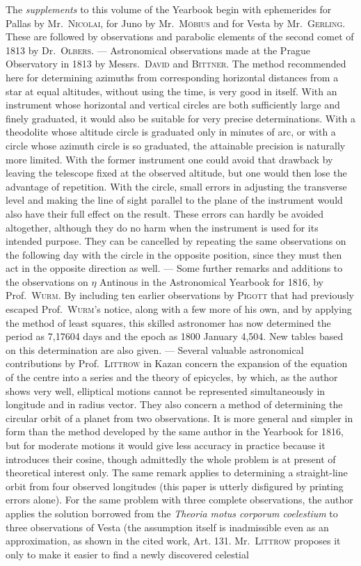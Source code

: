 The \emph{supplements} to this volume of the Yearbook begin with ephemerides for Pallas by Mr.\ \textsc{Nicolai}, for Juno by Mr.\ \textsc{Möbius} and for Vesta by Mr.\ \textsc{Gerling}. These are followed by observations and parabolic elements of the second comet of 1813 by Dr.\ \textsc{Olbers}. --- Astronomical observations made at the Prague Observatory in 1813 by Messrs.\ \textsc{David} and \textsc{Bittner}. The method recommended here for determining azimuths from corresponding horizontal distances from a star at equal altitudes, without using the time, is very good in itself. With an instrument whose horizontal and vertical circles are both sufficiently large and finely graduated, it would also be suitable for very precise determinations. With a theodolite whose altitude circle is graduated only in minutes of arc, or with a circle whose azimuth circle is so graduated, the attainable precision is naturally more limited. With the former instrument one could avoid that drawback by leaving the telescope fixed at the observed altitude, but one would then lose the advantage of repetition. With the circle, small errors in adjusting the transverse level and making the line of sight parallel to the plane of the instrument would also have their full effect on the result. These errors can hardly be avoided altogether, although they do no harm when the instrument is used for its intended purpose. They can be cancelled by repeating the same observations on the following day with the circle in the opposite position, since they must then act in the opposite direction as well. --- Some further remarks and additions to the observations on $\eta$ Antinous in the Astronomical Yearbook for 1816, by Prof.\ \textsc{Wurm}. By including ten earlier observations by \textsc{Pigott} that had previously escaped Prof.\ \textsc{Wurm}’s notice, along with a few more of his own, and by applying the method of least squares, this skilled astronomer has now determined the period as 7,17604 days and the epoch as 1800 January 4,504. New tables based on this determination are also given. --- Several valuable astronomical contributions by Prof.\ \textsc{Littrow} in Kazan concern the expansion of the equation of the centre into a series and the theory of epicycles, by which, as the author shows very well, elliptical motions cannot be represented simultaneously in longitude and in radius vector. They also concern a method of determining the circular orbit of a planet from two observations. It is more general and simpler in form than the method developed by the same author in the Yearbook for 1816, but for moderate motions it would give less accuracy in practice because it introduces their cosine, though admittedly the whole problem is at present of theoretical interest only. The same remark applies to determining a straight-line orbit from four observed longitudes (this paper is utterly disfigured by printing errors alone). For the same problem with three complete observations, the author applies the solution borrowed from the \emph{Theoria motus corporum coelestium} to three observations of Vesta (the assumption itself is inadmissible even as an approximation, as shown in the cited work, Art. 131. Mr.\ \textsc{Littrow} proposes it only to make it easier to find a newly discovered celestial 